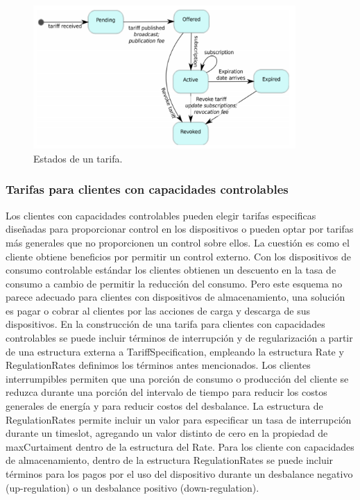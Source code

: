 \begin{figure}[h!]
	\centering
	\includegraphics[width=10cm]{img/state.png}
	\caption{Estados de un tarifa.}
	\label{state}
\end{figure}

\subsubsection{Tarifas para clientes con capacidades controlables}

Los clientes con capacidades controlables pueden elegir tarifas especificas diseñadas para proporcionar control en los dispositivos o pueden optar por tarifas más generales que no proporcionen un control sobre ellos. 
La cuestión es como el cliente obtiene beneficios por permitir un control externo. 
Con los dispositivos de consumo controlable estándar los clientes obtienen un descuento en la tasa de consumo a cambio de permitir la reducción del consumo. 
Pero este esquema no parece adecuado para clientes con dispositivos de almacenamiento, una solución es pagar o cobrar al clientes por las acciones de carga y descarga de sus dispositivos. 
En la construcción de una tarifa para clientes con capacidades controlables se puede incluir términos de interrupción y de regularización a partir de una estructura externa a TariffSpecification, empleando la estructura Rate y RegulationRates definimos los términos antes mencionados. 
Los clientes interrumpibles permiten que una porción de consumo o producción del cliente se reduzca durante una porción del intervalo de tiempo para reducir los costos generales de energía y para reducir costos del desbalance. 
La estructura de RegulationRates permite incluir un valor para especificar un tasa de interrupción durante un timeslot, agregando un valor distinto de cero en la propiedad de maxCurtaiment dentro de la estructura del Rate. 
Para los cliente con capacidades de almacenamiento, dentro de la estructura RegulationRates se puede incluir términos para los pagos por el uso del dispositivo durante un desbalance negativo (up-regulation) o un desbalance positivo (down-regulation).

